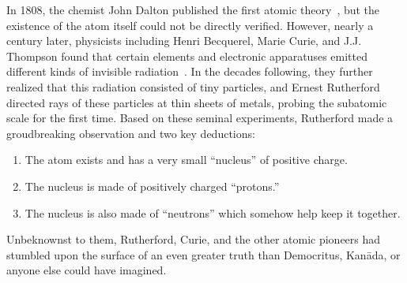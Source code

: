 \begin{dissertationintroduction}
In 1808, the chemist John Dalton published the first\footnotemark{} atomic theory~\cite{Dalton1805, Dalton1808}, but the existence of the atom itself could not be directly verified. 
However, nearly a century later, physicists including Henri Becquerel, Marie Curie, and J.J. Thompson found that certain elements and electronic apparatuses emitted different kinds of invisible radiation~\cite{Becquerel, Curie, RADVANYI2017544, Thompson}. 
In the decades following, they further realized that this radiation consisted of tiny particles\footnotemark{}, and Ernest Rutherford directed rays of these particles at thin sheets of metals, probing the subatomic scale for the first time. 
Based on these seminal experiments, Rutherford made a groudbreaking observation and two key deductions: %
\begin{enumerate}
    \item The atom exists\footnotemark{} and has a very small ``nucleus'' of positive charge.
    \item The nucleus is made of positively charged ``protons.''
    \item The nucleus is also made of ``neutrons'' which somehow help keep it together.
\end{enumerate}
Unbeknownst to them, Rutherford, Curie, and the other atomic pioneers had stumbled upon the surface of an even greater truth than Democritus, Kan\=ada, or anyone else could have imagined. 


\end{dissertationintroduction}
